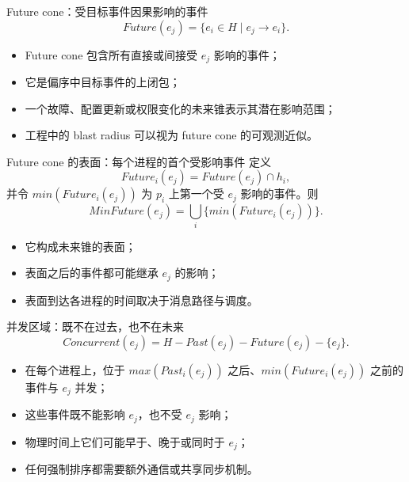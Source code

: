 \documentclass[UTF8,fontset=none,aspectratio=169,10pt]{beamer}
\begin{document}
\begin{frame}{Future cone：受目标事件因果影响的事件}
\[
Future(e_j)=\{e_i\in H\mid e_j\rightarrow e_i\}.
\]
\begin{itemize}
  \item Future cone 包含所有直接或间接受 $e_j$ 影响的事件；
  \item 它是偏序中目标事件的上闭包；
  \item 一个故障、配置更新或权限变化的未来锥表示其潜在影响范围；
  \item 工程中的 blast radius 可以视为 future cone 的可观测近似。
\end{itemize}
\end{frame}

\begin{frame}{Future cone 的表面：每个进程的首个受影响事件}
定义
\[
Future_i(e_j)=Future(e_j)\cap h_i,
\]
并令 $min(Future_i(e_j))$ 为 $p_i$ 上第一个受 $e_j$ 影响的事件。则
\[
MinFuture(e_j)=\bigcup_i\{min(Future_i(e_j))\}.
\]
\begin{itemize}
  \item 它构成未来锥的表面；
  \item 表面之后的事件都可能继承 $e_j$ 的影响；
  \item 表面到达各进程的时间取决于消息路径与调度。
\end{itemize}
\end{frame}

\begin{frame}{并发区域：既不在过去，也不在未来}
\[
Concurrent(e_j)=H-Past(e_j)-Future(e_j)-\{e_j\}.
\]
\begin{itemize}
  \item 在每个进程上，位于 $max(Past_i(e_j))$ 之后、$min(Future_i(e_j))$ 之前的事件与 $e_j$ 并发；
  \item 这些事件既不能影响 $e_j$，也不受 $e_j$ 影响；
  \item 物理时间上它们可能早于、晚于或同时于 $e_j$；
  \item 任何强制排序都需要额外通信或共享同步机制。
\end{itemize}
\end{frame}
\end{document}
